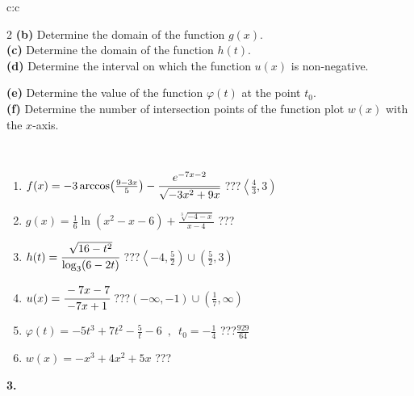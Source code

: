 \documentclass[10pt]{report}
\begin{document}
\begin{tabular}{c:c}
\begin{minipage}[c][104.5mm][t]{0.5\linewidth}
\begin{center}
\begin{minipage}{0.95\linewidth}
\begin{center}
{\begin{multicols}{2}
\textbf{(b)} Determine the domain of the function \(g(x)\). \\[1mm]
\textbf{(c)} Determine the domain of the function \(h(t)\). \\[1mm]
\textbf{(d)} Determine the interval on which the function \(u(x)\) is non-negative. \par \columnbreak
\textbf{(e)} Determine the value of the function \(\varphi(t)\) at the point \(t_0\). \\[1mm]
\textbf{(f)} Determine the number of intersection points of the function plot \(w(x)\) with the \(x\)-axis. \\[1mm]
\end{multicols}
}
\end{center}
\end{minipage}
\\[4mm]
\begin{minipage}{0.79\linewidth}
\begin{center}
\begin{varwidth}{\linewidth}
\begin{enumerate}
\small
\item $f(x) = -3\arccos\!\left( \frac{9-3x}{5} \right) - \cfrac{e^{-7x-2}}{\sqrt{-3x^2+9x}}$\quad \dotfill\; ???\;\dotfill \quad $\left\langle\frac{4}{3} , 3\right)$
\item $g(x) = \frac{1}{6} \ln{\!(x^2-x-6)}+\frac{\sqrt[3]{-4-x}}{x-4}$\quad \dotfill\; ???\;\dotfill {}
\item $h(t) = \cfrac{\sqrt{16-t^2}}{\log_3(6-2t)}$\quad \dotfill\; ???\;\dotfill \quad $\left\langle-4 , \frac{5}{2}\right)\cup\left(\frac{5}{2} , 3\right)$
\item $u(x) = \cfrac{-7x-7}{-7x+1}$\quad \dotfill\; ???\;\dotfill \quad $\left(-\infty , -1\right)\cup\left(\frac{1}{7} , \infty\right)$
\item $\varphi(t) = -5t^3+7t^2-\frac{5}{t}-6 \enspace , \enspace t_0=-\frac{1}{4}$\quad \dotfill\; ???\;\dotfill \quad $\frac{929}{64}$
\item $w(x) = -x^3+4x^2+5x$\quad \dotfill\; ???\;\dotfill {}
\end{enumerate}
\end{varwidth}
\end{center}
\end{minipage}
\begin{minipage}{0.20\linewidth}
\begin{center}
{\Huge\bfseries 3.} \\[2mm]

\end{center}
\end{minipage}
\end{center}
\end{minipage}
\end{tabular}
\end{document}
